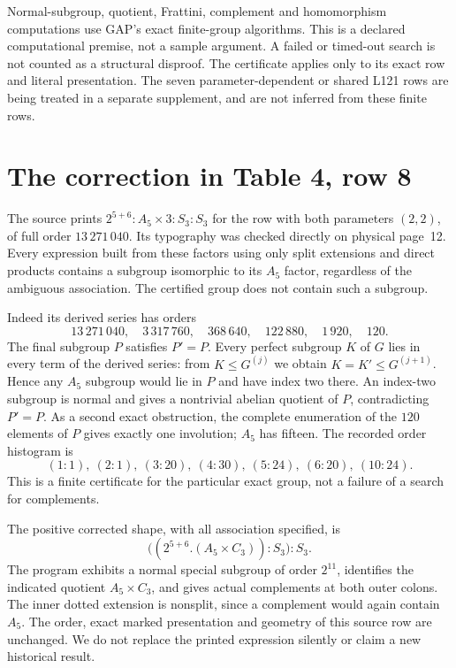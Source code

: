 \documentclass[11pt,a4paper]{article}
\begin{document}
Normal-subgroup, quotient, Frattini, complement and homomorphism
computations use GAP's exact finite-group algorithms. This is a declared
computational premise, not a sample argument. A failed or timed-out search
is not counted as a structural disproof. The certificate applies only to
its exact row and literal presentation. The seven parameter-dependent or
shared L121 rows are being treated in a separate supplement, and are not
inferred from these finite rows.

\section{The correction in Table 4, row 8}
The source prints $2^{5+6}:A_5\times3:S_3:S_3$ for the row with both
parameters $(2,2)$, of full order $13\,271\,040$. Its typography was checked
directly on physical page~12. Every expression built from these factors
using only split extensions and direct products contains a subgroup
isomorphic to its $A_5$ factor, regardless of the ambiguous association.
The certified group does not contain such a subgroup.

Indeed its derived series has orders
\[
13\,271\,040,\quad3\,317\,760,\quad368\,640,\quad122\,880,
\quad1\,920,\quad120.
\]
The final subgroup $P$ satisfies $P'=P$. Every perfect subgroup $K$ of
$G$ lies in every term of the derived series: from $K\leq G^{(j)}$ we
obtain $K=K'\leq G^{(j+1)}$. Hence any $A_5$ subgroup would lie in $P$
and have index two there. An index-two subgroup is normal and gives a
nontrivial abelian quotient of $P$, contradicting $P'=P$.
As a second exact obstruction, the complete enumeration of the $120$
elements of $P$ gives exactly one involution; $A_5$ has fifteen. The
recorded order histogram is
\[
(1:1),\ (2:1),\ (3:20),\ (4:30),\ (5:24),\ (6:20),\ (10:24).
\]
This is a finite certificate for the particular exact group, not a failure
of a search for complements.

The positive corrected shape, with all association specified, is
\begin{equation}\label{corrected}
 \bigl((2^{5+6}.(A_5\times C_3)):S_3\bigr):S_3.
\end{equation}
The program exhibits a normal special subgroup of order $2^{11}$,
identifies the indicated quotient $A_5\times C_3$, and gives actual
complements at both outer colons. The inner dotted extension is nonsplit,
since a complement would again contain $A_5$. The order, exact marked
presentation and geometry of this source row are unchanged. We do not
replace the printed expression silently or claim a new historical result.
\end{document}
